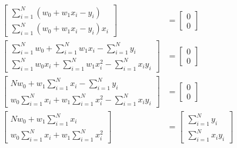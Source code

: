 \documentclass[12pt]{article}
\begin{document}
\begin{itemize}
\begin{itemize}
\begin{align*}
                            \begin{bmatrix}
                                \sum_{i=1}^N (w_0 + w_1x_i - y_i)\\
                                \sum_{i=1}^N (w_0 + w_1x_i - y_i)x_i
                            \end{bmatrix} &= \begin{bmatrix}
                                0\\
                                0
                            \end{bmatrix}\\
                            \begin{bmatrix}
                                \sum_{i=1}^N w_0 + \sum_{i=1}^N w_1x_i - \sum_{i=1}^N y_i\\
                                \sum_{i=1}^N w_0x_i + \sum_{i=1}^N w_1x_i^2 - \sum_{i=1}^N {x_i}y_i
                            \end{bmatrix} &= \begin{bmatrix}
                                0\\
                                0
                            \end{bmatrix}\\
                            \begin{bmatrix}
                                Nw_0 + w_1\sum_{i=1}^N x_i - \sum_{i=1}^N y_i\\
                                w_0\sum_{i=1}^N x_i + w_1\sum_{i=1}^N x_i^2 - \sum_{i=1}^N {x_i}y_i
                            \end{bmatrix} &= \begin{bmatrix}
                                0\\
                                0
                            \end{bmatrix}\\
                            \begin{bmatrix}
                                Nw_0 + w_1\sum_{i=1}^N x_i\\
                                w_0\sum_{i=1}^N x_i + w_1\sum_{i=1}^N x_i^2
                            \end{bmatrix} &= \begin{bmatrix}
                                \sum_{i=1}^N y_i\\
                                \sum_{i=1}^N {x_i}y_i
                            \end{bmatrix}\\

\end{align*}
\end{itemize}
\end{itemize}
\end{document}
